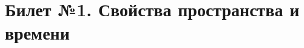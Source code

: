 \documentclass[a4paper]{article}
\begin{document}
\section{Билет №1. Свойства пространства и времени}
\end{document}
